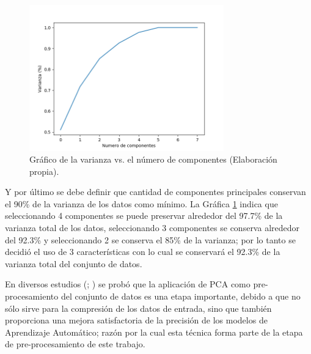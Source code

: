 \begin{figure}[h!]
  \begin{center}	\includegraphics[width=0.75\textwidth,frame]{imagenes/Cap3/pca}
  \caption{Gr\'{a}fico de la varianza vs. el n\'{u}mero de componentes (Elaboraci\'{o}n propia).}
  \label{fig:varianza-pca}
  \end{center}
\end{figure}

\vspace{5mm} %

Y por \'{u}ltimo se debe definir que cantidad de componentes principales conservan el 90\% de la varianza de los datos como m\'{i}nimo. La Gr\'{a}fica \ref{fig:varianza-pca} indica que seleccionando 4 componentes se puede preservar alrededor del 97.7\% de la varianza total de los datos, seleccionando 3 componentes se conserva alrededor del 92.3\% y seleccionando 2 se conserva el 85\% de la varianza; por lo tanto se decidi\'{o} el uso de 3 caracter\'{i}sticas con lo cual se conservar\'{a} el 92.3\% de la varianza total del conjunto de datos.

\vspace{5mm} %

En diversos estudios (; ) se prob\'{o} que la aplicaci\'{o}n de PCA como pre-procesamiento del conjunto de datos es una etapa importante, debido a que no s\'{o}lo sirve para la compresi\'{o}n de los datos de entrada, sino que tambi\'{e}n proporciona una mejora satisfactoria de la precisi\'{o}n de los modelos de Aprendizaje Autom\'{a}tico; raz\'{o}n por la cual esta t\'{e}cnica forma parte de la etapa de pre-procesamiento de este trabajo.


